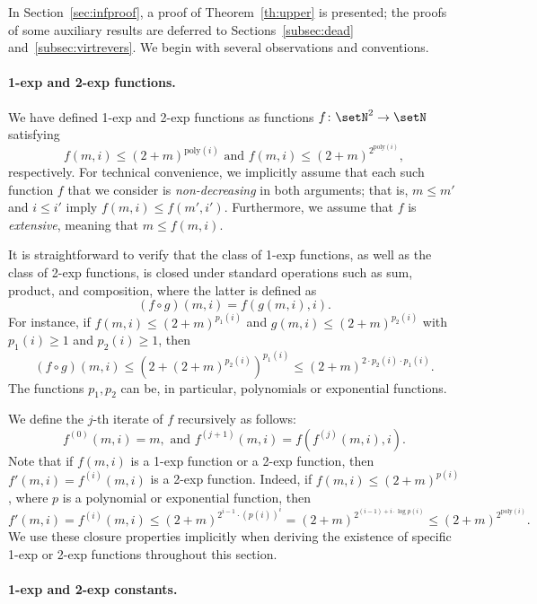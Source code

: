 In Section~\ref{sec:infproof}, a proof of Theorem~\ref{th:upper} is
presented; the proofs of some auxiliary results are deferred to
Sections~\ref{subsec:dead} and~\ref{subsec:virtrevers}. 
We begin with several
observations and conventions.


\paragraph{1-exp and 2-exp functions.}

We have defined 1-exp and 2-exp functions as functions $f\colon\setN^2\to\setN$
satisfying
\begin{equation*}
	f(m,i)\leq (2+m)^{\text{poly}(i)}\text{ and }
f(m,i)\leq (2+m)^{2^{\text{poly}(i)}},
\end{equation*}
	respectively.
For technical convenience, we implicitly assume that each such 
function $f$ that we consider is \emph{non-decreasing} in both arguments; that is, 
$m \leq m'$ and $i \leq i'$ imply $f(m, i) \leq f(m', i')$. 
Furthermore, we assume that $f$ is \emph{extensive}, meaning that $m \leq f(m,i)$.

It is straightforward to verify that the class of 1-exp functions, as
well as  the class of 2-exp functions, 
 is
closed under standard operations such as sum, product, and
composition, where the latter is
defined as \[(f\circ g)(m,i)=f(g(m,i),i).\]
For instance, if $f(m,i)\leq	(2+m)^{{p_1(i)}}$
and 
 $g(m,i)\leq	(2+m)^{{p_2(i)}}$ with $p_1(i)\geq 1$ and
 $p_2(i)\geq 1$, then  
\[(f\circ g)(m,i)\leq
\left(2+(2+m)^{{p_2(i)}}\right)^{{p_1(i)}}\leq 
(2+m)^{{2\cdot p_2(i)\cdot p_1(i)}}.\]
The functions $p_1, p_2$
can be, in particular, polynomials or exponential functions.

 We define the $j$-th iterate of $f$ recursively
as follows:
\begin{equation*}
	f^{(0)}(m,i)=m,\text{ and }
f^{(j+1)}(m,i) = f(f^{(j)}(m,i), i).
\end{equation*}
Note that 
if $f(m,i)$ is a 1-exp function or a 2-exp function, then $f'(m,i)=f^{(i)}(m,i)$ 
is a 2-exp function. Indeed,
if $f(m,i)\leq (2+m)^{{p(i)}}$, where $p$ is a polynomial or
exponential function, then
\[f'(m,i)=f^{(i)}(m,i)\leq (2+m)^{2^{i-1}\cdot
(p(i))^i}=(2+m)^{2^{(i-1)+ i\cdot \log
p(i)}}\leq(2+m)^{2^{\text{poly}(i)}}.\]
We use these closure properties
implicitly when deriving the existence of specific 1-exp or 2-exp functions 
throughout this section.

\paragraph{1-exp and 2-exp constants.}

